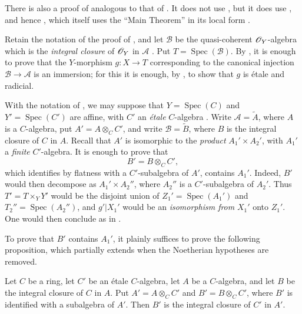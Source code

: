 \begin{remark}[18.12.14]
\label{IV.18.12.14}
There is also a proof of  analogous to that of . It does not use , but it does use , and hence , which itself uses the ``Main Theorem'' in its local form .

Retain the notation of the proof of , and let $\mathscr{B}$ be the quasi-coherent $\mathscr{O}_Y$-algebra which is the \emph{integral closure} of $\mathscr{O}_Y$ in $\mathscr{A}$ . Put $T=\operatorname{Spec}(\mathscr{B})$. By , it is enough to prove that the $Y$-morphism $g:X\to T$ corresponding to the canonical injection $\mathscr{B}\to\mathscr{A}$ is an immersion; for this it is enough, by , to show that $g$ is \'etale and radicial.

With the notation of , we may suppose that $Y=\operatorname{Spec}(C)$ and $Y'=\operatorname{Spec}(C')$ are affine, with $C'$ an \emph{\'etale} $C$-algebra . Write $\mathscr{A}=\widetilde{A}$, where $A$ is a $C$-algebra, put $A'=A\otimes_CC'$, and write $\mathscr{B}=\widetilde{B}$, where $B$ is the integral closure of $C$ in $A$. Recall that $A'$ is isomorphic to the \emph{product} $A_1'\times A_2'$, with $A_1'$ a \emph{finite} $C'$-algebra. It is enough to prove that
\[
  B'=B\otimes_CC',
\]
which identifies by flatness with a $C'$-subalgebra of $A'$, contains $A_1'$. Indeed, $B'$ would then decompose as $A_1'\times A_2''$, where $A_2''$ is a $C'$-subalgebra of $A_2'$. Thus $T'=T\times_YY'$ would be the disjoint union of $Z_1'=\operatorname{Spec}(A_1')$ and $T_2''=\operatorname{Spec}(A_2'')$, and $g'|X_1'$ would be an \emph{isomorphism from} $X_1'$ onto $Z_1'$. One would then conclude as in .

To prove that $B'$ contains $A_1'$, it plainly suffices to prove the following proposition, which partially extends  when the Noetherian hypotheses are removed.
\end{remark}

\begin{proposition}[18.12.15]
\label{IV.18.12.15}
Let $C$ be a ring, let $C'$ be an \textup{\'etale} $C$-algebra, let $A$ be a $C$-algebra, and let $B$ be the integral closure of $C$ in $A$. Put $A'=A\otimes_CC'$ and $B'=B\otimes_CC'$, where $B'$ is identified with a subalgebra of $A'$. Then $B'$ is the integral closure of $C'$ in $A'$.
\end{proposition}

